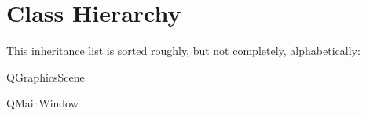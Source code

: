 \section{Class Hierarchy}
This inheritance list is sorted roughly, but not completely, alphabetically\+:\begin{DoxyCompactList}
\item Q\+Graphics\+Scene\begin{DoxyCompactList}
\item {}
\end{DoxyCompactList}
\item Q\+Main\+Window\begin{DoxyCompactList}
\item {}
\end{DoxyCompactList}
\item {}
\end{DoxyCompactList}
